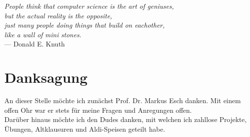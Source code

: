 
\begin{flushright}{\slshape    
    People think that computer science is the art of geniuses,\\
    but the actual reality is the opposite,\\
    just many people doing things that build on eachother,\\
    like a wall of mini stones.} \\ \medskip
    --- Donald E. Knuth 
\end{flushright}

\bigskip

\begingroup
	\let\clearpage\relax
	\let\cleardoublepage\relax
	\let\cleardoublepage\relax
	\chapter*{Danksagung}
	An dieser Stelle möchte ich zunächst Prof. Dr. Markus Esch danken. Mit einem offen Ohr war er stets  für meine Fragen und Anregungen offen.\\
	Darüber hinaus möchte ich den Dudes danken, mit welchen ich zahllose  Projekte, Übungen, Altklausuren und Aldi-Speisen geteilt habe. 




\endgroup

